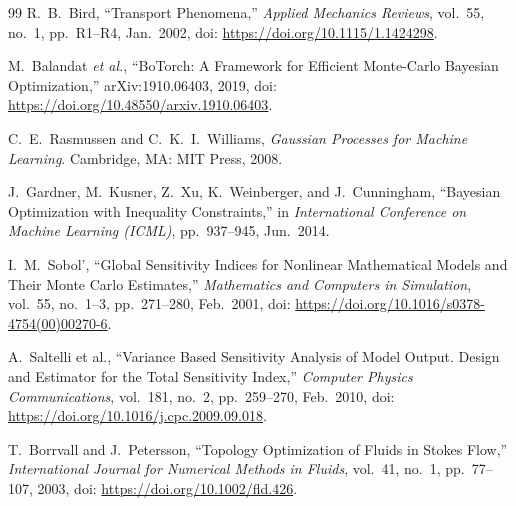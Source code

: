 \documentclass[12pt]{article}
\begin{document}
\begin{thebibliography}{99}
R.~B.~Bird, ``Transport Phenomena,'' \textit{Applied Mechanics Reviews}, vol.~55, no.~1, pp.~R1--R4, Jan.~2002, doi: \url{https://doi.org/10.1115/1.1424298}.

M.~Balandat \textit{et al.}, ``BoTorch: A Framework for Efficient Monte-Carlo Bayesian Optimization,'' arXiv:1910.06403, 2019, doi: \url{https://doi.org/10.48550/arxiv.1910.06403}.

C.~E.~Rasmussen and C.~K.~I.~Williams, \textit{Gaussian Processes for Machine Learning}. Cambridge, MA: MIT Press, 2008.

J.~Gardner, M.~Kusner, Z.~Xu, K.~Weinberger, and J.~Cunningham, ``Bayesian Optimization with Inequality Constraints,'' in \textit{International Conference on Machine Learning (ICML)}, pp.~937--945, Jun.~2014.

I.~M.~Sobol', ``Global Sensitivity Indices for Nonlinear Mathematical Models and Their Monte Carlo Estimates,'' \textit{Mathematics and Computers in Simulation}, vol.~55, no.~1--3, pp.~271--280, Feb.~2001, doi: \url{https://doi.org/10.1016/s0378-4754(00)00270-6}.

A.~Saltelli et al., ``Variance Based Sensitivity Analysis of Model Output. Design and Estimator for the Total Sensitivity Index,'' \textit{Computer Physics Communications}, vol.~181, no.~2, pp.~259--270, Feb.~2010, doi: \url{https://doi.org/10.1016/j.cpc.2009.09.018}.

T.~Borrvall and J.~Petersson, ``Topology Optimization of Fluids in Stokes Flow,'' \textit{International Journal for Numerical Methods in Fluids}, vol.~41, no.~1, pp.~77--107, 2003, doi: \url{https://doi.org/10.1002/fld.426}.

\end{thebibliography}
\end{document}
